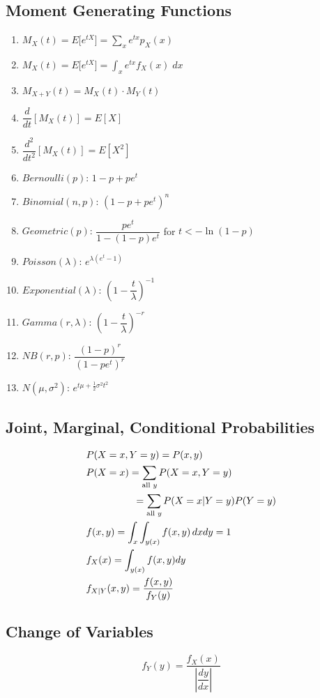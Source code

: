\documentclass[11pt, twocolumn]{article}
\theoremstyle{definition}
\begin{document}
\subsection*{Moment Generating Functions}
\begin{enumerate}
\item $M_X(t)=E\bigg [e^{tX} \bigg ]=\sum_{x}e^{tx}p_X(x)$
\item $M_X(t)=E\bigg [e^{tX} \bigg ]=\int_{x}e^{tx}f_X(x) \; dx$
\item $M_{X+Y}(t)=M_X(t) \cdot M_Y(t)$
\item $\dfrac{d}{dt}[M_X(t)]=E[X]$
\item $\dfrac{d^2}{dt^2}[M_X(t)]=E[X^2]$
\item $Bernoulli(p): \,1-p+pe^t$
\item $Binomial(n,p): \, (1-p+pe^t)^n$
\item $Geometric(p): \,\dfrac{pe^t}{1-(1-p) e^t}$ for $t<-\ln(1-p)\!$
\item $Poisson(\lambda): \, e^{\lambda(e^t-1)}$
\item $Exponential(\lambda): \, \left(1-\dfrac{t}{\lambda}\right)^{-1}$
\item $Gamma(r,\lambda): \, \left(1 - \dfrac{t}{\lambda}\right)^{-r}$
\item $NB(r,p): \, \dfrac{(1-p)^r}{(1-pe^t)^r}$
\item $N(\mu, \sigma ^2): \, e^{t\mu + \frac{1}{2}\sigma^2t^2}$
\end{enumerate}




\subsection*{Joint, Marginal, Conditional Probabilities} \vspace{-.1cm}
\begin{align*}
	&P(X=x,Y=y)=P(x,y)\\
&P(X=x)=\sum_{ \text{all } y} P(X=x,Y=y)\\
&\hspace{1.7cm} =\sum_{ \text{all } y} P(X=x|Y=y)P(Y=y)\\
&f(x,y)=\int_{ x} \int_{y(x)} f(x,y) \, dx dy = 1\\
&f_X(x)=\int_{y(x)} f(x,y)dy\\
&f_{X|Y}(x,y)=\frac{ f(x,y)}{f_Y(y)}
\end{align*}



\subsection*{Change of Variables}
\[f_Y(y)=\frac{f_X(x)}{\left\vert \dfrac{dy}{dx} \right\vert }\]
\end{document}
